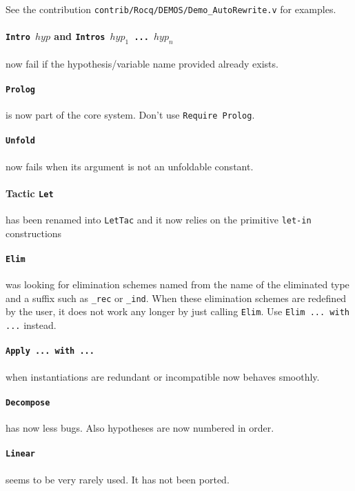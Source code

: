 \documentclass[11pt]{article}
\begin{document}
  See the contribution \texttt{contrib/Rocq/DEMOS/Demo\_AutoRewrite.v} for
  examples.

  \paragraph{{\tt Intro $hyp$} and {\bf \tt Intros $hyp_1$ ... $hyp_n$}}
  now fail if the hypothesis/variable name provided already exists.

  \paragraph{{\tt Prolog}} is now part of the core
  system. Don't use {\tt Require Prolog}.

  \paragraph{{\tt Unfold}} now fails when its argument is not an
  unfoldable constant.

  \paragraph{Tactic {\tt Let}} has been renamed into {\tt LetTac}
  and it now relies on the primitive {\tt let-in} constructions

  \paragraph{{\tt Elim}} was looking for elimination schemes named
  from the name of the eliminated type and a suffix such as
  \verb:_rec: or \verb:_ind:. When these elimination schemes are
  redefined by the user, it does not work any longer by just calling
  {\tt Elim}. Use {\tt Elim ... with ...} instead.

  \paragraph{{\tt Apply ... with ...}} when instantiations are
  redundant or incompatible now behaves smoothly.

  \paragraph{{\tt Decompose}} has now less bugs. Also hypotheses
  are now numbered in order.

  \paragraph{{\tt Linear}} seems to be very rarely used. It has not
  been ported.
\end{document}
